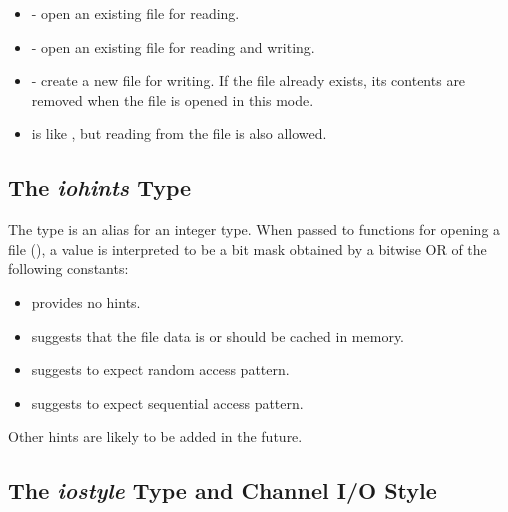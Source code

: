 \begin{itemize}

\item {} - open an existing file for reading.

\item {} - open an existing file for reading and writing.

\item {} - create a new file for writing.
      If the file already exists, its contents are removed
      when the file is opened in this mode.

\item {} is like ,
      but reading from the file is also allowed.

\end{itemize}


\subsection{The {\em iohints} Type}
\label{IO_iohints_type}

The  type is an alias for an integer type.
When passed to functions for opening a file (),
a  value is interpreted to be a bit mask obtained
by a bitwise OR of the following constants:


\begin{itemize}

\item {} provides no hints.

\item {} suggests that the file data is or should be
      cached in memory.

\item {} suggests to expect random access pattern.

\item {} suggests to expect sequential access pattern.

\end{itemize}

\begin{future}
Other hints are likely to be added in the future.
\end{future}


\subsection{The {\em iostyle} Type and Channel I/O Style}
\label{IO_iostyle_type}
\label{IO_io_style}

